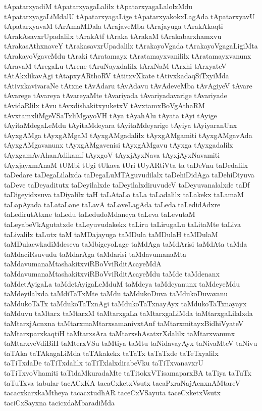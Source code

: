 {tApatarxyadiM
tApatarxyagaLalilx
tApatarxyagaLalolxMdu
tApatarxyagaLiMdalU
tApatarxyagaLige
tApatarxyakokxLagAda
tApatarxyavU
tApatarxyavaM
tArAmaMDala
tArajaveMba
tArajayuga
tArakAkaqti
tArakAsavxrUpadalilx
tArakAtf
tAraka
tArakaM
tArakabarxhamxvu
tArakasAthxnaveY
tArakasavxrUpadalilx
tArakayoVgada
tArakayoVgagaLigiMta
tArakayoVgaveMdu
tAraki
tAratamayx
tAratamayxvanililx
tAratamayxvanunx
tAravaM
tAregaLu
tArene
tAruNayxdalilx
tArxNaM
tArxhi
tArxyateV
tAtAkxlikavAgi
tAtapxyARthoRV
tAtitxvXkate
tAtivxkadaqSiTxyiMda
tAtivxkavivaraNe
tAtxne
tAvAdaru
tAvAdavu
tAvAdeveMba
tAvAgiyeV
tAvare
tAvarege
tAvareya
tAvareyaMte
tAvariyada
tAvariyadavarige
tAvariyade
tAvidaRlilx
tAvu
tAvxdishakitxyuketxV
tAvxtamxBoVgAthaRM
tAvxtamxliMgeVSaTxliMgayoVH
tAya
tAyahAlu
tAyata
tAyi
tAyige
tAyitaMdegaLeMdu
tAyitaMdeyara
tAyitaMdeyarige
tAyiya
tAyiyaranUnx
tAyxgAMga
tAyxgAMgaM
tAyxgAMgadalilx
tAyxgAMgamiti
tAyxgAMgavAda
tAyxgAMgavanunx
tAyxgAMgavenisi
tAyxgAMgavu
tAyxga
tAyxgadalilx
tAyxgamAvAhanAdikamf
tAyxgoV
tAyxjAyxNava
tAyxjAyxNavamiti
tAyxjayxmAnaM
tUMbi
tUgi
tUkava
tUri
tUyARtiVta
ta
taDeVnu
taDedalilx
taDedare
taDegaLilalxda
taDegaLuMTAguvudilalx
taDehiDidAga
taDehiDiyuva
taDeve
taDeyaditutx
taDeyilalxde
taDeyilalxdiruvudeV
taDeyuvanalalxde
taDf
taDigeyidxsuva
taDiyalilx
taH
taLAtaLa
taLa
taLadalilx
taLakekx
taLamaM
taLapAyada
taLataLane
taLavA
taLaveLagAda
taLeda
taLedidAdxre
taLedirutAtxne
taLedu
taLedudoMdaneya
taLeva
taLevutaM
taLeyabeVkAgutatxde
taLeyuvudakekx
taLiru
taLirugaLu
taLitaMte
taLiva
taLivalilx
taLutx
taM
taMDajayuga
taMDula
taMDulaH
taMDulaM
taMDulacwkadiMdeseva
taMbigeyoLage
taMdAga
taMdArisi
taMdAta
taMda
taMdaciRsuvudu
taMdarAga
taMdarisi
taMdavumanaMta
taMdavumanaMtashakitxviRBoVviRditAcayeMdA
taMdavumanaMtashakitxviRBoVviRditAcayeMdu
taMde
taMdenanx
taMdetAyigaLa
taMdetAyigaLeMduM
taMdeya
taMdeyanunx
taMdeyeMdu
taMdeyilalxda
taMdiTaTxMte
taMdu
taMdukoDuva
taMdukoDuvavanu
taMdukoTaTx
taMdukoTaTxnAgi
taMdukoTaTxnayAyx
taMdukoTaTxnayayx
taMduvu
taMtarx
taMtarxM
taMtarxgaLa
taMtarxgaLiMda
taMtarxgaLilalxda
taMtarxjAcnxna
taMtarxmaMtarxsamanivxtAnf
taMtarxmitayxBidhiVyateV
taMtarxparxkaqtiH
taMtarxsAra
taMtarxshAsatxrXdalilx
taMtarxvanunx
taMtarxveVdiBiH
taMterxVSu
taMtiya
taMtu
taNidavayAyx
taNivaMteV
taNivu
taTAka
taTAkagaLiMda
taTAkakekx
taTaTx
taTaTxde
taTeTxyalilx
taTiTxdaDe
taTiTxdalilx
taTiTxlalxdirabeVku
taTiTxvanavxrU
taTiTxvoVhamiti
taTidaMkuradaMte
taTitokxVTisamaparxBA
taTiya
taTuTx
taTuTxva
tabular
tacACxKA
tacaCxketxVsutx
tacaPxraNajAcnxnAMtareV
tacacxkarxkaMtheya
tacacxtudhAR
taceCxVSayuta
taceCxketxVsutx
taciCxSayxna
tacicxdaMbaradiMda
}
